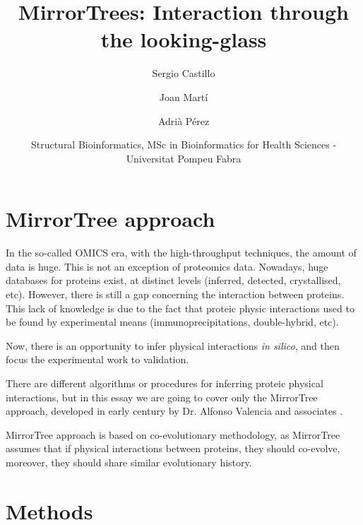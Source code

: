\documentclass[11pt]{article}
\title{MirrorTrees: Interaction through the looking-glass}
\author{
	Sergio Castillo
	\and
	Joan Martí
	\and
	Adrià Pérez
}
\date{Structural Bioinformatics, MSc in Bioinformatics for Health Sciences - Universitat Pompeu Fabra}
\begin{document}
\maketitle

\section{MirrorTree approach}
In the so-called OMICS era, with the high-throughput techniques, the amount of data is huge. This is not an exception of proteomics data. Nowadays, huge databases for proteins exist, at distinct levels (inferred, detected, crystallised, etc). However, there is still a gap concerning the interaction between proteins. This lack of knowledge is due to the fact that proteic physic interactions used to be found by experimental means (immunoprecipitations, double-hybrid, etc).


Now, there is an opportunity to infer physical interactions \textit{in silico}, and then focus the experimental work to validation.

There are different algorithms or procedures for inferring proteic physical interactions, but in this essay we are going to cover only the MirrorTree approach, developed in early century by Dr. Alfonso Valencia and associates \cite{Pazos2001}.


MirrorTree approach is based on co-evolutionary methodology, as MirrorTree assumes that if physical interactions between proteins, they should co-evolve, moreover, they should share similar evolutionary history.



\section{Methods}
\end{document}
